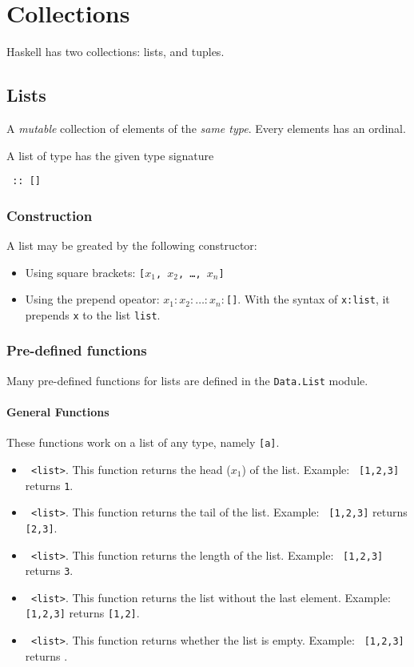 \section{Collections}

Haskell has two collections: lists, and tuples.

\subsection{Lists}
A \textit{mutable} collection of elements of the \textit{same type}. Every elements has an ordinal.

A list of type \texttt{} has the given type signature
\begin{center}
  \texttt{ :: []}
\end{center}

\subsubsection{Construction}
A list may be greated by the following constructor:
\begin{itemize}
  \item Using square brackets: \texttt{[$x_1$, $x_2$, \ldots, $x_n$]}
  \item Using the prepend opeator: \texttt{$x_1:x_2:\ldots:x_n:$[]}. With the syntax of \texttt{x:list}, it prepends \texttt{x} to the list \texttt{list}.
\end{itemize}

\subsubsection{Pre-defined functions}
Many pre-defined functions for lists are defined in the \texttt{Data.List} module.

\paragraph{General Functions} These functions work on a list of any type, namely \texttt{[a]}.
\begin{itemize}
  \item \texttt{ <list>}. This function returns the head ($x_1$) of the list. Example: \texttt{ [1,2,3]} returns \texttt{1}.
  \item \texttt{ <list>}. This function returns the tail of the list. Example: \texttt{ [1,2,3]} returns \texttt{[2,3]}.
  \item \texttt{ <list>}. This function returns the length of the list. Example: \texttt{ [1,2,3]} returns \texttt{3}.
  \item \texttt{ <list>}. This function returns the list without the last element. Example: \texttt{ [1,2,3]} returns \texttt{[1,2]}.
  \item \texttt{ <list>}. This function returns whether the list is empty. Example: \texttt{ [1,2,3]} returns \texttt{}.
\end{itemize}

